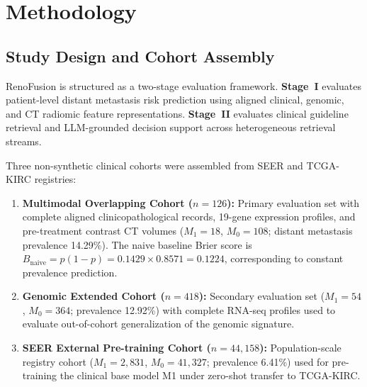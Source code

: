 \section{Methodology}
\label{sec:methods}

\subsection{Study Design and Cohort Assembly}
RenoFusion is structured as a two-stage evaluation framework. \textbf{Stage~I} evaluates patient-level distant metastasis risk prediction using aligned clinical, genomic, and CT radiomic feature representations. \textbf{Stage~II} evaluates clinical guideline retrieval and LLM-grounded decision support across heterogeneous retrieval streams.

Three non-synthetic clinical cohorts were assembled from SEER and TCGA-KIRC registries:
\begin{enumerate}
    \item \textbf{Multimodal Overlapping Cohort ($n = 126$):} Primary evaluation set with complete aligned clinicopathological records, 19-gene expression profiles, and pre-treatment contrast CT volumes ($M_1 = 18$, $M_0 = 108$; distant metastasis prevalence 14.29\%). The naive baseline Brier score is $B_{\text{naive}} = p(1-p) = 0.1429 \times 0.8571 = 0.1224$, corresponding to constant prevalence prediction.
    \item \textbf{Genomic Extended Cohort ($n = 418$):} Secondary evaluation set ($M_1 = 54$, $M_0 = 364$; prevalence 12.92\%) with complete RNA-seq profiles used to evaluate out-of-cohort generalization of the genomic signature.
    \item \textbf{SEER External Pre-training Cohort ($n = 44,158$):} Population-scale registry cohort ($M_1 = 2,831$, $M_0 = 41,327$; prevalence 6.41\%) used for pre-training the clinical base model M1 under zero-shot transfer to TCGA-KIRC.
\end{enumerate}

